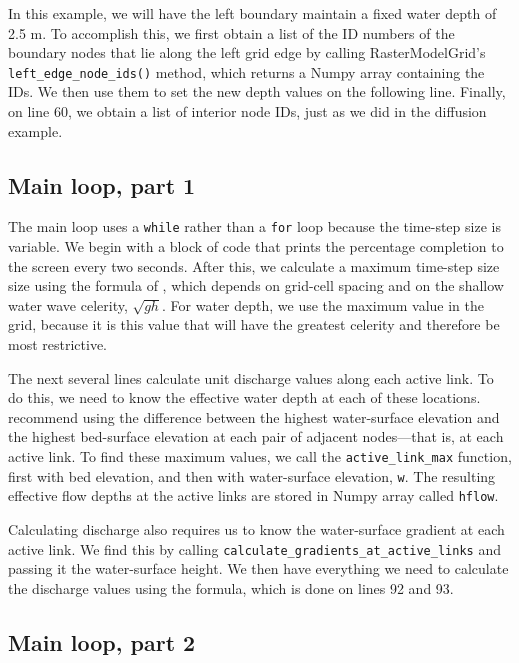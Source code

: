 \documentclass[12pt]{article}
\newcommand{\code}[1]{{\tt #1}}
\begin{document}
In this example, we will have the left boundary maintain a fixed water depth of 2.5 m. To accomplish this, we first obtain a list of the ID numbers of the boundary nodes that lie along the left grid edge by calling RasterModelGrid's \code{left\_edge\_node\_ids()} method, which returns a Numpy array containing the IDs. We then use them to set the new depth values on the following line. Finally, on line 60, we obtain a list of interior node IDs, just as we did in the diffusion example.

\subsection{Main loop, part 1}



The main loop uses a \code{while} rather than a \code{for} loop because the time-step size is variable. We begin with a block of code that prints the percentage completion to the screen every two seconds. After this, we calculate a maximum time-step size size using the formula of \citet{bates2010simple}, which depends on grid-cell spacing and on the shallow water wave celerity, $\sqrt{g h}$. For water depth, we use the maximum value in the grid, because it is this value that will have the greatest celerity and therefore be most restrictive.

The next several lines calculate unit discharge values along each active link. To do this, we need to know the effective water depth at each of these locations. \citet{bates2010simple} recommend using the difference between the highest water-surface elevation and the highest bed-surface elevation at each pair of adjacent nodes---that is, at each active link. To find these maximum values, we call the \code{active\_link\_max} function, first with bed elevation, and then with water-surface elevation, \code{w}. The resulting effective flow depths at the active links are stored in Numpy array called \code{hflow}. 

Calculating discharge also requires us to know the water-surface gradient at each active link. We find this by calling \code{calculate\_gradients\_at\_active\_links} and passing it the water-surface height. We then have everything we need to calculate the discharge values using the \citet{bates2010simple} formula, which is done on lines 92 and 93.

\subsection{Main loop, part 2}
\end{document}
